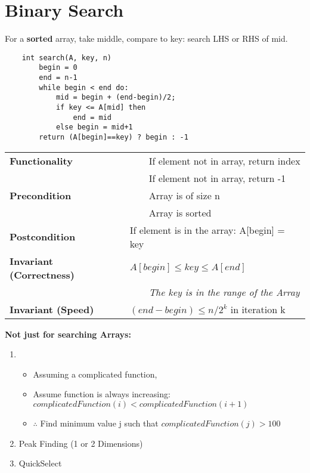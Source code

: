 \documentclass{article}
\newcommand{\tabitem}{~~\llap{\textbullet}~~}
\begin{document}
    \pagebreak

    \section{Binary Search}
    For a \textbf{sorted }array, take middle, compare to key: search LHS or RHS of mid.

    \begin{verbatim}
    int search(A, key, n)
        begin = 0
        end = n-1
        while begin < end do:
            mid = begin + (end-begin)/2;
            if key <= A[mid] then
                end = mid
            else begin = mid+1
        return (A[begin]==key) ? begin : -1    
    \end{verbatim}


    \begin{tabular}{ll}
        \toprule
        \textbf{Functionality} & \tabitem If element not in array, return index\\
        & \tabitem If element not in array, return -1\\
        \midrule
        \textbf{Precondition} & \tabitem Array is of size n\\
        & \tabitem Array is sorted\\
        \midrule
        \textbf{Postcondition} & If element is in the array: A[begin] = key\\
        \midrule
        \textbf{Invariant (Correctness)} & $A[begin] \leq key \leq A[end]$ \\
        & \tabitem \emph{The key is in the range of the Array}\\
        \midrule
        \textbf{Invariant (Speed)} & $(end-begin) \leq n/2^{k}$ in iteration k \\
        \bottomrule
    \end{tabular}

    \bigskip
    \textbf{Not just for searching Arrays:}
    \begin{enumerate}
        \item \begin{itemize}
            \item Assuming a complicated function,
            \item Assume function is always increasing: $complicatedFunction(i) < complicatedFunction(i+1)$
            \item $\therefore$ Find minimum value j such that $complicatedFunction(j) > 100$
        \end{itemize}

        \item Peak Finding (1 or 2 Dimensions)
        \item QuickSelect
    \end{enumerate}
\end{document}
